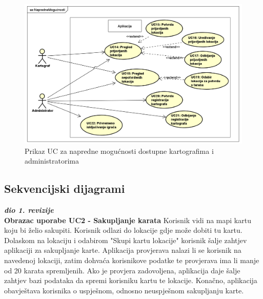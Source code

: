 		\begin{figure}[H]
			\includegraphics[width=\textwidth]{slike/UCNapredneMogucnosti.png} %
			\caption{Prikaz UC za napredne mogućnosti dostupne kartografima i administratorima}
			\label{fig:UCnapredneMogucnosti} %
		\end{figure}
\pagebreak

\eject		

\subsection{Sekvencijski dijagrami}

\textbf{\textit{dio 1. revizije}}\\

\noindent \textbf{Obrazac uporabe UC2 - Sakupljanje karata}
    Korisnik vidi na mapi kartu koju bi želio sakupiti. Korisnik odlazi do lokacije gdje može dobiti tu kartu. Dolaskom na lokaciju i odabirom "Skupi kartu lokacije" korisnik šalje zahtjev aplikaciji za sakupljanje karte. Aplikacija provjerava nalazi li se korisnik na navedenoj lokaciji, zatim dohvaća korisnikove podatke te provjerava ima li manje od 20 karata spremljenih. Ako je provjera zadovoljena, aplikacija daje šalje zahtjev bazi podataka da spremi korisniku kartu te lokacije. Konačno, aplikacija obavještava korisnika o uspješnom, odnosno neuspješnom sakupljanju karte.

